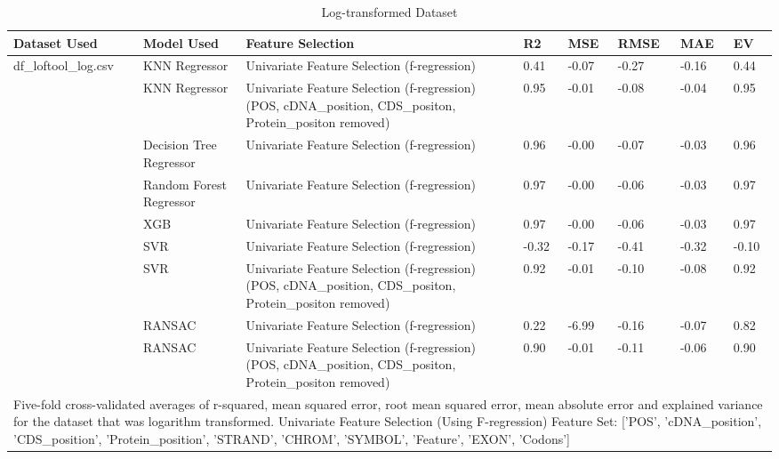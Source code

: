 \documentclass[journal,two side,web]{ieeecolor}
\begin{document}
\clearpage
\begin{table}
\centering
\begin{minipage}{\textwidth}
\centering
\caption{Log-transformed Dataset}
\label{table}
\setlength{\tabcolsep}{3pt}
\begin{tabular}{|p{60pt}|p{90pt}|p{150pt}|p{25pt}|p{25pt}|p{25pt}|p{25pt}|p{25
pt}|}
\hline
Dataset Used & Model Used & Feature Selection & R2 & MSE & RMSE & MAE & EV \\
\hline
df\_loftool\_log.csv & KNN Regressor & Univariate Feature Selection (f-regression) & 0.41 & -0.07 & -0.27 & -0.16 & 0.44 \\
\hline
 & KNN Regressor & Univariate Feature Selection (f-regression) (POS, cDNA\_position, CDS\_positon, Protein\_positon removed) & 0.95 & -0.01 & -0.08 & -0.04 & 0.95 \\
\hline
 & Decision Tree Regressor & Univariate Feature Selection (f-regression) & 0.96 & -0.00 & -0.07 & -0.03 & 0.96 \\
\hline
& Random Forest Regressor & Univariate Feature Selection (f-regression) & 0.97 & -0.00 & -0.06 & -0.03 & 0.97 \\
\hline
 & XGB & Univariate Feature Selection (f-regression) & 0.97 & -0.00 & -0.06 & -0.03 & 0.97 \\
\hline
& SVR & Univariate Feature Selection (f-regression) & -0.32 & -0.17 & -0.41 & -0.32 & -0.10 \\
\hline
 & SVR & Univariate Feature Selection (f-regression) (POS, cDNA\_position, CDS\_positon, Protein\_positon removed) & 0.92 & -0.01 & -0.10 & -0.08 & 0.92 \\
\hline
& RANSAC & Univariate Feature Selection (f-regression) & 0.22 & -6.99 & -0.16 & -0.07 & 0.82 \\
\hline
 & RANSAC & Univariate Feature Selection (f-regression) (POS, cDNA\_position, CDS\_positon, Protein\_positon removed) & 0.90 & -0.01 & -0.11 & -0.06 & 0.90 \\
\hline
\multicolumn{8}{p{450pt}}{Five-fold cross-validated averages of r-squared, mean squared error, root mean squared error, mean absolute error and explained variance for the dataset that was logarithm transformed. Univariate Feature Selection (Using F-regression) Feature Set: ['POS', 'cDNA\_position', 'CDS\_position', 'Protein\_position', 'STRAND', 'CHROM', 'SYMBOL', 'Feature', 'EXON', 'Codons']}\\
\end{tabular}
\end{minipage}
\end{table}
\end{document}

